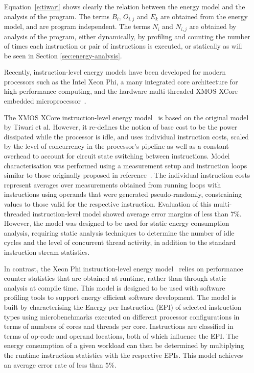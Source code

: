 \documentclass[oneside]{book}
\begin{document}
Equation~\ref{e:tiwari} shows clearly the relation between the energy model and the
analysis of the program.  The terms $B_i$, $O_{i,j}$ and $E_k$ are obtained from the energy
model, and are program independent. The terms $N_i$ and $N_{i,j}$ are obtained by
analysis of the program, either dynamically, by profiling and counting the number of 
times each instruction or pair of instructions is executed, or statically as will be seen
in Section \ref{sec:energy-analysis}.


Recently, instruction-level energy models have been developed for modern
processors such as the Intel Xeon Phi, a many integrated core architecture for
high-performance computing, and the hardware multi-threaded XMOS XCore embedded
microprocessor~\cite{XMOS:Arch}.

The XMOS XCore instruction-level energy
model~\cite{DBLP:journals/tecs/KerrisonE15} is based on the original model by
Tiwari et al. However, it re-defines the notion of base cost to be the power
dissipated while the processor is idle, and uses individual instruction costs,
scaled by the level of concurrency in the processor's pipeline as well as a
constant overhead to account for circuit state switching between instructions.
%
Model characterisation was performed using a measurement setup and instruction
loops similar to those originally proposed in reference~\cite{Tiwari-embedded-1994}. The
individual instruction costs represent averages over measurements obtained from
running loops with instructions using operands that were generated
pseudo-randomly, constraining values to those valid for the respective
instruction.
%
Evaluation of this multi-threaded instruction-level model showed average error
margins of less than 7\%. 
%
%
%
However, the model was designed to be used for static energy consumption analysis,
requiring static analysis techniques to determine the number of idle cycles and
the level of concurrent thread activity, in addition to the standard
instruction stream statistics.

In contrast, the Xeon Phi instruction-level energy model~\cite{phimodel} relies
on performance counter statistics that are obtained at runtime, rather than
through static analysis at compile time. This model is designed to be used with
software profiling tools to support energy efficient software development. The
model is built by characterising the Energy per Instruction (EPI) of selected
instruction types using microbenchmarks executed on different processor
configurations in terms of numbers of cores and threads per core. Instructions
are classified in terms of op-code and operand locations, both of which
influence the EPI.
%
The energy consumption of a given workload can then be determined by
multiplying the runtime instruction statistics with the respective EPIs.
%
This model achieves an average error rate of less than 5\%.
\end{document}
